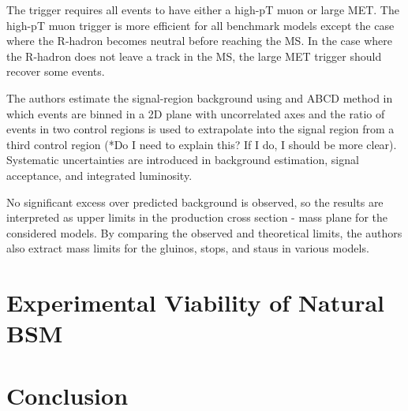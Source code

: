 \documentclass[12pt]{article}
\begin{document}
            The trigger requires all events to have either a high-pT muon or large MET. The high-pT muon trigger is more efficient for all benchmark models except the case where the R-hadron becomes neutral before reaching the MS. In the case where the R-hadron does not leave a track in the MS, the large MET trigger should recover some events.  

            The authors estimate the signal-region background using and ABCD method in which events are binned in a 2D plane with uncorrelated axes and the ratio of events in two control regions is used to extrapolate into the signal region from a third control region (*Do I need to explain this? If I do, I should be more clear). Systematic uncertainties are introduced in background estimation, signal acceptance, and integrated luminosity.

            No significant excess over predicted background is observed, so the results are interpreted as upper limits in the production cross section - mass plane for the considered models. By comparing the observed and theoretical limits, the authors also extract mass limits for the gluinos, stops, and staus in various models.

\section{Experimental Viability of Natural BSM}

\section{Conclusion}

\clearpage
\pagebreak
\singlespacing
{}

\end{document}
